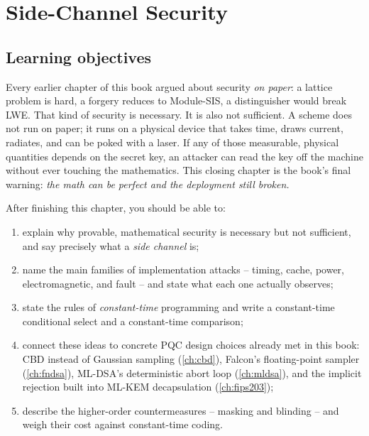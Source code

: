 \chapter{Side-Channel Security}
\label{ch:sidechannel}

\section{Learning objectives}

Every earlier chapter of this book argued about security \emph{on paper}: a lattice
problem is hard, a forgery reduces to Module-SIS, a distinguisher would break LWE.
That kind of security is necessary. It is also not sufficient. A scheme does not run
on paper; it runs on a physical device that takes time, draws current, radiates,
and can be poked with a laser. If any of those measurable, physical quantities
depends on the secret key, an attacker can read the key off the machine without ever
touching the mathematics. This closing chapter is the book's final warning:
\emph{the math can be perfect and the deployment still broken.}

After finishing this chapter, you should be able to:

\begin{enumerate}
  \item explain why provable, mathematical security is necessary but not sufficient,
        and say precisely what a \emph{side channel} is;
  \item name the main families of implementation attacks -- timing, cache, power,
        electromagnetic, and fault -- and state what each one actually observes;
  \item state the rules of \emph{constant-time} programming and write a constant-time
        conditional select and a constant-time comparison;
  \item connect these ideas to concrete PQC design choices already met in this book:
        CBD instead of Gaussian sampling (\ref{ch:cbd}), Falcon's floating-point
        sampler (\ref{ch:fndsa}), ML-DSA's deterministic abort loop (\ref{ch:mldsa}),
        and the implicit rejection built into ML-KEM decapsulation (\ref{ch:fips203});
  \item describe the higher-order countermeasures -- masking and blinding -- and
        weigh their cost against constant-time coding.
\end{enumerate}

